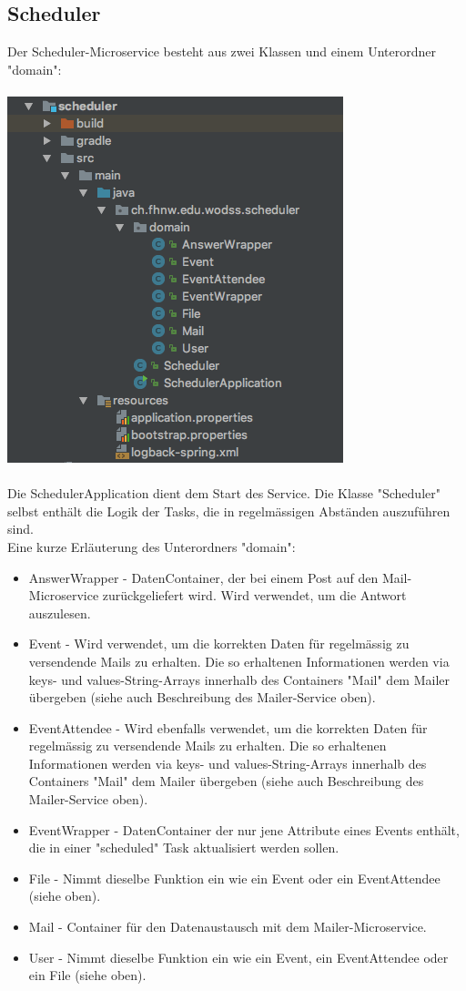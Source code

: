 \documentclass[11pt]{article} %
\begin{document}
\subsection{Scheduler}
Der Scheduler-Microservice besteht aus zwei Klassen und einem Unterordner "domain":
\\
\\
\includegraphics[scale=0.7]{structure_scheduler}
\\
\\
Die SchedulerApplication dient dem Start des Service. Die Klasse "Scheduler" selbst enthält die Logik der Tasks, die in regelmässigen Abständen auszuführen sind.
\\
Eine kurze Erläuterung des Unterordners "domain":
\begin{itemize}
\item AnswerWrapper - DatenContainer, der bei einem Post auf den Mail-Microservice zurückgeliefert wird. Wird verwendet, um die Antwort auszulesen.
\item Event - Wird verwendet, um die korrekten Daten für regelmässig zu versendende Mails zu erhalten. Die so erhaltenen Informationen werden via keys- und values-String-Arrays innerhalb des Containers "Mail" dem Mailer übergeben (siehe auch Beschreibung des Mailer-Service oben).
\item EventAttendee - Wird ebenfalls verwendet, um die korrekten Daten für regelmässig zu versendende Mails zu erhalten. Die so erhaltenen Informationen werden via keys- und values-String-Arrays innerhalb des Containers "Mail" dem Mailer übergeben (siehe auch Beschreibung des Mailer-Service oben).
\item EventWrapper - DatenContainer der nur jene Attribute eines Events enthält, die in einer "scheduled" Task aktualisiert werden sollen.
\item File - Nimmt dieselbe Funktion ein wie ein Event oder ein EventAttendee (siehe oben).
\item Mail - Container für den Datenaustausch mit dem Mailer-Microservice.
\item User - Nimmt dieselbe Funktion ein wie ein Event, ein EventAttendee oder ein File (siehe oben).
\end{itemize}
\newpage
\end{document}
